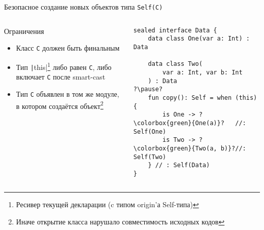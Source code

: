 \documentclass[handout,aspectratio=169,usenames,dvipsnames]{beamer}
\begin{document}
    \begin{frame}[fragile]{Безопасное создание новых объектов типа \texttt{Self(C)}}
        \begin{columns}[onlytextwidth]
            \begin{column}[t]{0.46\textwidth}
                \begin{block}{Ограничения}
                    \begin{itemize}
                        \item Класс \texttt{C} должен быть финальным
                        \item Тип \texttt|this|\footnote{Ресивер текущей декларации (c типом origin'а Self-типа)} либо равен \texttt{С}, либо включает \texttt{C} после smart-cast
                        \item Тип \texttt{C} объявлен в том же модуле, в котором создаётся объект\footnote{Иначе открытие класса нарушало совместимость исходных кодов}
                    \end{itemize}
                \end{block}
            \end{column}\hfill%
            \begin{column}[t]{0.50\textwidth}
                \pause
                \begin{verbatim}
sealed interface Data {
    data class One(var a: Int) : Data

    data class Two(
        var a: Int, var b: Int
    ) : Data
?\pause?
    fun copy(): Self = when (this) {
        is One -> ?\colorbox{green}{One(a)}?   //: Self(One)
        is Two -> ?\colorbox{green}{Two(a, b)}?//: Self(Two)
    } // : Self(Data)
}
                \end{verbatim}
            \end{column}
        \end{columns}
    \end{frame}
\end{document}
